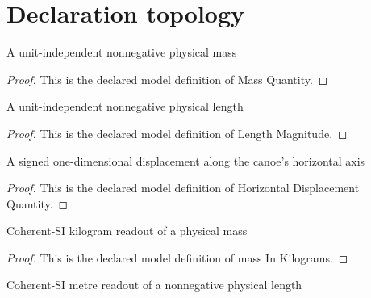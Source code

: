 \section{Declaration topology}
\begin{definition}
  \label{def:physics:phyx-mini-0769:phyxminiproblems-problemphyxmini0769-massquantity}
  A unit-independent nonnegative physical mass
\end{definition}
\begin{proof}
  This is the declared model definition of Mass Quantity.
\end{proof}
\begin{definition}
  \label{def:physics:phyx-mini-0769:phyxminiproblems-problemphyxmini0769-lengthmagnitude}
  A unit-independent nonnegative physical length
\end{definition}
\begin{proof}
  This is the declared model definition of Length Magnitude.
\end{proof}
\begin{definition}
  \label{def:physics:phyx-mini-0769:phyxminiproblems-problemphyxmini0769-horizontaldisplacementquantity}
  A signed one-dimensional displacement along the canoe's horizontal axis
\end{definition}
\begin{proof}
  This is the declared model definition of Horizontal Displacement Quantity.
\end{proof}
\begin{definition}
  \label{def:physics:phyx-mini-0769:phyxminiproblems-problemphyxmini0769-massinkilograms}
  Coherent-SI kilogram readout of a physical mass
\end{definition}
\begin{proof}
  This is the declared model definition of mass In Kilograms.
\end{proof}
\begin{definition}
  \label{def:physics:phyx-mini-0769:phyxminiproblems-problemphyxmini0769-lengthinmeters}
  Coherent-SI metre readout of a nonnegative physical length
\end{definition}
